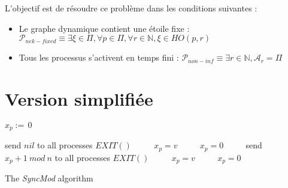 \documentclass{article}
\begin{document}
L'objectif est de résoudre ce problème dans les conditions suivantes :
\begin{itemize}

	\item Le graphe dynamique contient une étoile fixe : $\mathcal{P}_{nek-fixed} \equiv \exists \xi \in \Pi, \forall p \in \Pi, \forall r \in \mathds{N}, \xi \in HO(p, r)$
	\item Tous les processus s'activent en temps fini : $\mathcal{P}_{non-inf} \equiv \exists r \in \mathds{N}, \mathcal{A}_r = \Pi$

\end{itemize}

\section{Version simplifiée}

\begin{algorithm}[htb]
\begin{distribalgo}[1]
\BLANK {}
  \STATE $x_p :=\, 0$ 

\ENDINDENT \BLANK

    \STATE send $nil$ to all processes
  \ENDINDENT
  \BLANK
	\STATE $EXIT()$ ~~~~
	\STATE $x_p = v$ ~~~~
	\ELSE
	\STATE $x_p = 0$ ~~~~
	\ENDIF
  \ENDINDENT
\ENDINDENT \BLANK
{}
    \STATE send $x_p+1~mod~n$ to all processes
  \ENDINDENT
  \BLANK
	\STATE $EXIT()$ ~~~~
	\STATE $x_p = v$ ~~~~
	\ELSE
	\STATE $x_p = 0$ ~~~~
	\ENDIF
  \ENDINDENT
\ENDINDENT \BLANK


\caption{The {\em SyncMod} algorithm} \label{algo:R}
\end{distribalgo}

\end{algorithm}
\end{document}
